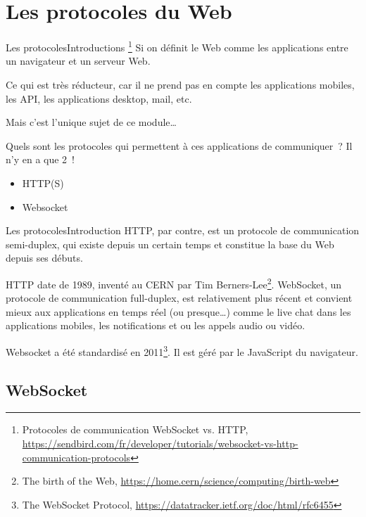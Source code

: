 \documentclass{beamer}
\begin{document}
    \section{Les protocoles du Web}\label{sec:protocoles}

    \begin{frame}{Les protocoles}{Introductions}
        \footnote{\label{sendbird-protocole}Protocoles de communication WebSocket vs. HTTP, \url{https://sendbird.com/fr/developer/tutorials/websocket-vs-http-communication-protocols}}
        Si on définit le Web comme les applications entre un navigateur et un serveur Web.
        \begin{dangercolorbox}
            Ce qui est très réducteur, car il ne prend pas en compte les applications mobiles, les API, les applications desktop, mail, etc.

            Mais c'est l'unique sujet de ce module\ldots
        \end{dangercolorbox}
        Quels sont les protocoles qui permettent à ces applications de communiquer~?
        \pause
        \bigbreak
        Il n'y en a que 2~!
        \begin{itemize}
            \item HTTP(S)
            \item Websocket
        \end{itemize}
    \end{frame}

    \begin{frame}{Les protocoles}{Introduction\label{sendbird-protocole}}
        HTTP, par contre, est un protocole de communication semi-duplex, qui existe depuis un certain temps et constitue la base du Web depuis ses débuts.

        HTTP date de 1989, inventé au CERN par Tim Berners-Lee\footnote{The birth of the Web, \url{https://home.cern/science/computing/birth-web}}.
        \bigbreak
        WebSocket, un protocole de communication full-duplex, est relativement plus récent et convient mieux aux applications en temps réel (ou presque\ldots) comme le live chat dans les applications mobiles, les notifications et ou les appels audio ou vidéo.

        Websocket a été standardisé en 2011\footnote{The WebSocket Protocol, \url{https://datatracker.ietf.org/doc/html/rfc6455}}.
        Il est géré par le JavaScript du navigateur.
    \end{frame}

    \subsection{WebSocket}\label{subsec:websocket}
\end{document}
